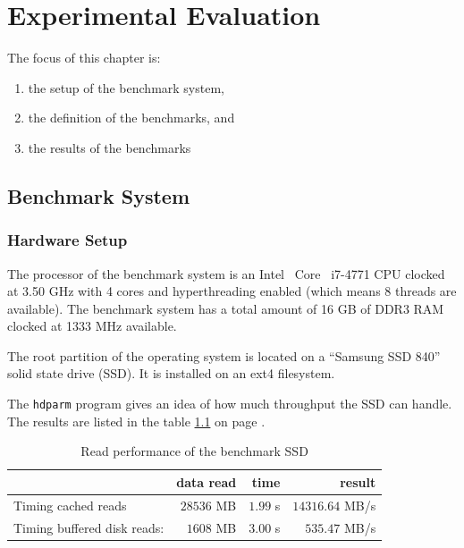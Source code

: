 \chapter{Experimental Evaluation}


The focus of this chapter is:
\begin{enumerate}
\item the setup of the benchmark system,
\item the definition of the benchmarks, and
\item the results of the benchmarks
\end{enumerate}

%

\section{Benchmark System}
  \subsection{Hardware Setup}

The processor of the benchmark system is an Intel\textregistered~ Core\texttrademark~ i7-4771 CPU clocked at 3.50 GHz with 4 cores and hyperthreading enabled (which means 8 threads are available).
The benchmark system has a total amount of 16 GB of DDR3 RAM clocked at 1333 MHz available.

The root partition of the operating system is located on a ``Samsung SSD 840'' solid state drive (SSD).
It is installed on an ext4 filesystem.

The \texttt{hdparm} program gives an idea of how much throughput the SSD can handle. The results are listed in the table \ref{eval-ssd} on page \pageref{eval-ssd}.

\begin{table}[h]
\centering
\caption{Read performance of the benchmark SSD}
\label{eval-ssd}
\begin{tabular}{lrrr}
\textbf{}                   & \textbf{data read} & \textbf{time} & \textbf{result} \\ \hline
Timing cached reads         & $28536$ MB         & $1.99$ s      & $14316.64$ MB/s \\
Timing buffered disk reads: & $1608$ MB          & $3.00$ s      & $535.47$ MB/s   \\ \hline
\end{tabular}
\end{table}

